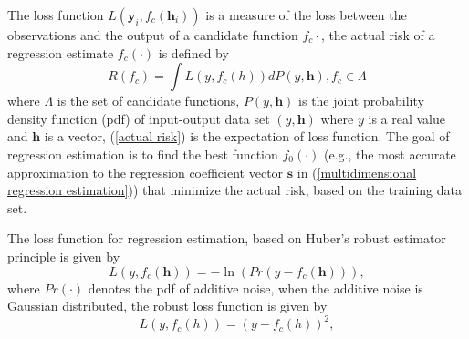 \documentclass[10pt, draftclsnofoot, onecolumn]{IEEEtran}
\begin{document}
The loss function $L(\mathbf{y}_{i}, f_{c}(\mathbf{h}_{i}))$ is a measure of the loss between the observations and the output of a candidate function $f_{c}{\cdot}$, the actual risk of a regression estimate $f_{c}(\cdot)$ is defined by\cite{vapnik1998statistical}
\begin{equation}
R(f_{c})=\int L(y, f_{c}(h))dP(y, \mathbf{h}), f_{c}\in \Lambda
\label{actual risk}
\end{equation} 
where $\Lambda$ is the set of candidate functions, $P(y, \mathbf{h})$ is the joint probability density function (pdf) of input-output data set $(y, \mathbf{h})$ where $y$ is a real value and $\mathbf{h}$ is a vector, (\ref{actual risk}) is the expectation of loss function. The goal of regression estimation is to find the best function $f_{0}(\cdot)$ (e.g., the most accurate approximation to the regression coefficient vector $\mathbf{s}$ in (\ref{multidimensional regression estimation})) that minimize the actual risk, based on the training data set.

The loss function for regression estimation, based on Huber's robust estimator principle\cite{huber2011robust} is given by 
\begin{equation}
L(y, f_{c}(\mathbf{h}))=-\ln(Pr(y-f_{c}(\mathbf{h}))),
\label{robust loss function}
\end{equation}  
where $Pr(\cdot)$ denotes the pdf of additive noise, when the additive noise is Gaussian distributed, the robust loss function is given by 
\begin{equation}
L(y, f_{c}(h))=(y-f_{c}(h))^{2},
\label{robust loss function normal}
\end{equation}

\end{document}
